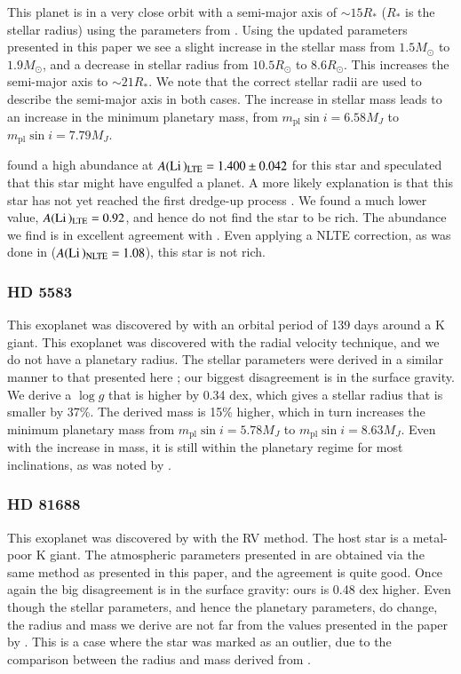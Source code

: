 \documentclass{aa}
\begin{document}
This planet is in a very close orbit with a semi-major axis of $\sim 15R_\ast$
($R_\ast$ is the stellar radius) using the parameters from \citet{Nowak2013}.
Using the updated parameters presented in this paper we see a slight increase in
the stellar mass from $1.5M_\odot$ to $1.9M_\odot$, and a decrease in stellar
radius from $10.5R_\odot$ to $8.6R_\odot$. This increases the semi-major axis to
$\sim 21R_\ast$. We note that the correct stellar radii are used to describe the
semi-major axis in both cases. The increase in stellar mass leads to an increase
in the minimum planetary mass, from $m_\mathrm{pl}\sin i=6.58M_J$ to
$m_\mathrm{pl}\sin i=7.79M_J$.

\citet{Nowak2013} found a high  abundance at
$A(\ion{Li}{})_\mathrm{LTE}=1.400\pm0.042$ for this star and speculated that
this star might have engulfed a planet. A more likely explanation is that this
star has not yet reached the first dredge-up process \citep{Nowak2013}. We found
a much lower value, $A(\ion{Li}{})_\mathrm{LTE}=0.92$, and hence do not find the
star to be  rich. The  abundance we find is in excellent
agreement with \citet{Adamow2014}. Even applying a NLTE correction, as was done
in \citet{Adamow2014} ($A(\ion{Li}{})_\mathrm{NLTE}=1.08$), this star is not
 rich.


\subsubsection{HD 5583}
\label{sub:HD_5583}
This exoplanet was discovered by \citet{Niedzielski2016} with an orbital period
of 139 days around a K giant. This exoplanet was discovered with the radial
velocity technique, and we do not have a planetary radius. The stellar
parameters were derived in a similar manner to that presented here
\citep[see][and references therein]{Niedzielski2016}; our biggest disagreement
is in the surface gravity. We derive a $\log g$ that is higher by 0.34 dex,
which gives a stellar radius that is smaller by 37\%. The derived mass is 15\%
higher, which in turn increases the minimum planetary mass from
$m_\mathrm{pl}\sin i=5.78M_J$ to $m_\mathrm{pl}\sin i=8.63M_J$. Even with the
increase in mass, it is still within the planetary regime for most inclinations,
as was noted by \citet{Niedzielski2016}.



\subsubsection{HD 81688}
\label{sub:HD81688}
This exoplanet was discovered by \citet{Sato2008} with the RV method. The host
star is a metal-poor K giant. The atmospheric parameters presented in
\citet{Sato2008} are obtained via the same method as presented in this paper,
and the agreement is quite good. Once again the big disagreement is in the
surface gravity: ours is 0.48 dex higher. Even though the stellar parameters,
and hence the planetary parameters, do change, the radius and mass we derive are
not far from the values presented in the paper by \citet{Sato2008}. This is a
case where the star was marked as an outlier, due to the comparison between the
radius and mass derived from \citet{Torres2010}.
\end{document}
